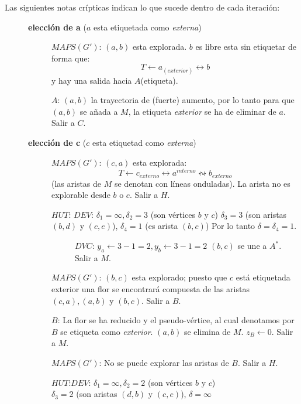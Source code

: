 \documentclass[10pt,a5paper]{book}
\begin{document}
Las siguientes notas crípticas indican lo que sucede dentro de cada iteración:
\begin{description}
\item[] \textbf{elección de a} ($a$ esta etiquetada como \emph{externa})
  \begin{description}
  \item[] $MAPS(G')$: $(a,b)$ esta explorada. $b$ es libre esta sin etiquetar de forma que:
    \[ T \leftarrow a_{(exterior)} \longleftrightarrow b \]
    y hay una salida hacia $A$(etiqueta).
  \item[] $A$: $(a,b)$ la trayectoria de (fuerte) aumento, por lo tanto para que $(a,b)$ se añada a $M$, la etiqueta \emph{exterior} se ha de eliminar de $a$.
    Salir a $C$.
  \end{description}
\item[] \textbf{elección de c} ($c$ esta etiquetad como \emph{externa})
  \begin{description}
  \item[] $MAPS(G')$: $(c,a)$ esta explorada:
    \[ T \leftarrow c_{externo} \longleftrightarrow a^{interno} \leftrightsquigarrow b_{externo} \]
    (las aristas de $M$ se denotan con líneas onduladas).
    La arista no es explorable desde $b$ o $c$.
    Salir a $H$.
  \item[] $HUT$: $DEV$: $\delta_1 = \infty, \delta_2 = 3$ (son vértices $b$ y $c$)
    $\delta_3 = 3$ (son aristas $(b,d)$ y $(c,e)$), $\delta_4 = 1$ (es arista $(b,c)$)
    Por lo tanto $\delta = \delta_4 = 1.$
    \begin{description}
    \item[]\quad$DVC$: $y_a \leftarrow 3 - 1 = 2, y_b \leftarrow 3 - 1 = 2$
      $(b,c)$ se une a $A^*$. Salir a $M$.
    \end{description}
  \item[] $MAPS(G')$: $(b,c)$ esta explorado; puesto que $c$ está etiquetada exterior una flor se encontrará compuesta de las aristas $(c,a),(a,b)$ y $(b,c)$. Salir a $B$.
  \item[] $B$: La flor se ha reducido y el pseudo-vértice, al cual denotamos por $B$ se etiqueta como \emph{exterior}. $(a,b)$ se elimina de $M$. $z_B \leftarrow 0$. Salir a $M$.
  \item[] $MAPS(G')$: No se puede explorar las aristas de $B$. Salir a $H$.
  \item[] $HUT$:$DEV$: $\delta_1 = \infty, \delta_2 = 2$ (son vértices $b$ y $c$)\\
    \quad $\delta_3 = 2$ (son aristas $(d,b)$ y $(c,e)$), $\delta = \infty$\\

\end{description}
\end{description}
\end{document}
